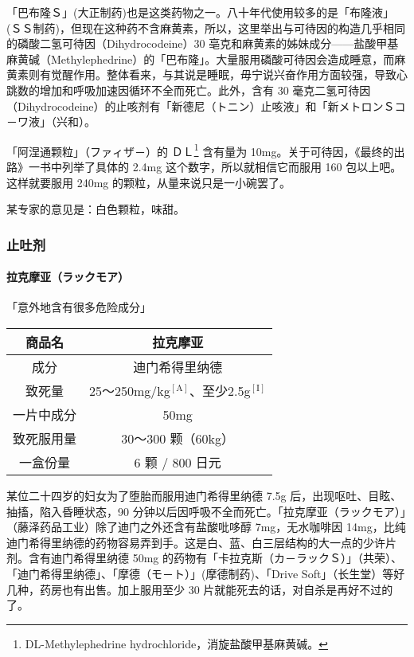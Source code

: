 \documentclass[UTF8]{ctexart}
\begin{document}
「巴布隆Ｓ」(大正制药)也是这类药物之一。八十年代使用较多的是「布隆液」(ＳＳ制药)，但现在这种药不含麻黄素，所以，这里举出与可待因的构造几乎相同的磷酸二氢可待因（Dihydrocodeine）30 亳克和麻黄素的姊妹成分——盐酸甲基麻黄碱（Methylephedrine）的「巴布隆」。大量服用磷酸可待因会造成睡意，而麻黄素则有觉醒作用。整体看来，与其说是睡眠，毋宁说兴奋作用方面较强，导致心跳数的增加和呼吸加速因循环不全而死亡。此外，含有 30 毫克二氢可待因（Dihydrocodeine）的止咳剂有「新德尼（トニン）止咳液」和「新メトロンＳコ－ワ液」（兴和）。

「阿涅通颗粒」（ファィザ－）的 ＤＬ\footnote{DL-Methylephedrine hydrochloride，消旋盐酸甲基麻黄碱。} 含有量为 10mg。关于可待因，《最终的出路》一书中列举了具体的 2.4mg 这个数字，所以就相信它而服用 160 包以上吧。这样就要服用 240mg 的颗粒，从量来说只是一小碗罢了。

某专家的意见是：白色颗粒，味甜。

\subsubsection*{止吐剂}

\paragraph*{拉克摩亚（ラックモア）}

\begin{flushright}
「意外地含有很多危险成分」
\end{flushright}

\begin{table}[htbp]
\begin{center}
\begin{tabular}{cc}

\toprule
商品名 & 拉克摩亚 \\
\midrule
成分 & 迪门希得里纳德 \\
致死量 & 25～250mg/kg$^\mathrm{[A]}$、至少2.5g$^\mathrm{[I]}$ \\
一片中成分 & 50mg \\
致死服用量 & 30～300 颗（60kg） \\
一盒份量 & 6 颗 / 800 日元 \\
\bottomrule
\end{tabular}
\end{center}
\end{table}

某位二十四岁的妇女为了堕胎而服用迪门希得里纳德 7.5g 后，出现呕吐、目眩、抽搐，陷入昏睡状态，90 分钟以后因呼吸不全而死亡。「拉克摩亚（ラックモア）」（藤泽药品工业）除了迪门之外还含有盐酸吡哆醇 7mg，无水咖啡因 14mg，比纯迪门希得里纳德的药物容易弄到手。这是白、蓝、白三层结构的大一点的少许片剂。含有迪门希得里纳德 50mg 的药物有「卡拉克斯（カ－ラックＳ）」（共荣）、「迪门希得里纳德」、「摩德（モ－ト）」(摩德制药)、「Drive Soft」（长生堂）等好几种，药房也有出售。加上服用至少 30 片就能死去的话，对自杀是再好不过的了。
\end{document}
